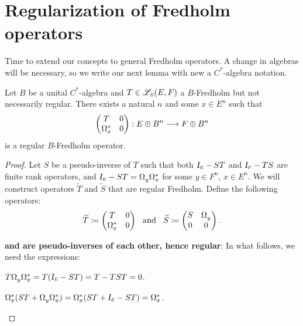 \section{Regularization of Fredholm operators}

Time to extend our concepts to general Fredholm operators. A change in algebras will be necessary, so we write our next lemma with new a $C^*$-algebra notation.

\begin{lema}
    \label{lema: construcao regularizacao}
    Let $B$ be a unital $C^*$-algebra and $T \in \sub\adj B(E,F)$ a $B$-Fredholm but not necessarily regular. There exists a natural $n$ and some $x\in E^n$ such that  \begin{equation*}
        \begin{pmatrix} T & 0 \\ \Omega_x^* & 0 \end{pmatrix}: E\oplus B^n \longrightarrow F\oplus B^n
    \end{equation*}
    is a regular $B$-Fredholm operator.
    \begin{proof}
    Let $S$ be a pseudo-inverse of $T$ such that both $\sub \Id E - ST$ and $\sub \Id F - TS$ are finite rank operators, and $\sub \Id E - ST = \Omega_{y}^{\,}\Omega_x^*$ for some $y \in F^n$, $x \in E^n$. We will construct operators $\widetilde{T}$ and $\widetilde{S}$ that are regular Fredholm. Define the following operators:
    \begin{equation*}
        \widetilde T \coloneqq \begin{pmatrix} T & 0 \\ \Omega_x^* & 0 \end{pmatrix} \hspace{0.25cm}\operatorname{and}\hspace{0.25cm}
        \widetilde S \coloneqq \begin{pmatrix} S & \Omega_y^{\,} \\ 0 & 0\end{pmatrix}.
    \end{equation*}
    \begin{itroman}
        \item \textbf{ and  are pseudo-inverses of each other, hence regular}: In what follows, we need the expressions: 
        \begin{alter}
        \item \label{lema: construcao regularizacao item 1}$T\Omega_y^{\,}\Omega_x^* = T(\sub \Id E - ST) = T - TST = 0$.
        \item \label{lema: construcao regularizacao item 2} $\Omega_x^*(ST + \Omega_y^{\,}\Omega_x^*) = \Omega_x^* (ST+\sub \Id E - ST) = \Omega_x^*$.

\end{alter}
\end{itroman}
\end{proof}
\end{lema}
